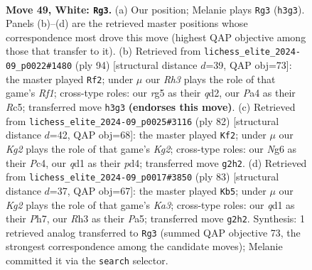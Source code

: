 \documentclass[11pt]{article}
\begin{document}
\clearpage

\begin{figure}[p]\centering
\begin{subfigure}{0.46\textwidth}\centering
\resizebox{\linewidth}{!}{%
\newchessgame
\chessboard[
  setfen={6k1/2r3p1/1p4N1/6r1/P2pp3/7R/5PK1/3q4 w - - 2 49},
  showmover=false,
  pgfstyle=straightmove, color=movearrow, markmove={h3-g3}
]}
\caption{}
\end{subfigure}\hfill
\begin{subfigure}{0.46\textwidth}\centering
\resizebox{\linewidth}{!}{%
\newchessgame
\chessboard[
  setfen={n7/3P2pk/p6p/2R1p3/4P3/7P/3q2K1/5R2 w - - 1 48},
  showmover=false,
  pgfstyle=straightmove, color=movearrow, markmove={f1-f2}
]}
\caption{}
\end{subfigure}
\\[4pt]
\begin{subfigure}{0.46\textwidth}\centering
\resizebox{\linewidth}{!}{%
\newchessgame
\chessboard[
  setfen={2r2k2/5p2/p3p3/4P1q1/P1Pp4/8/6K1/7R w - - 0 42},
  showmover=false,
  pgfstyle=straightmove, color=movearrow, markmove={g2-f2}
]}
\caption{}
\end{subfigure}\hfill
\begin{subfigure}{0.46\textwidth}\centering
\resizebox{\linewidth}{!}{%
\newchessgame
\chessboard[
  setfen={8/5p1p/k2R1p2/p4P2/2r5/6P1/1P5P/1K6 b - - 2 42},
  showmover=false,
  pgfstyle=straightmove, color=movearrow, markmove={a6-b5}
]}
\caption{}
\end{subfigure}
\caption{\textbf{Move 49, White: \texttt{Rg3}.} (a) Our position; Melanie plays \texttt{Rg3} (\texttt{h3g3}). Panels (b)--(d) are the retrieved master positions whose correspondence most drove this move (highest QAP objective among those that transfer to it). (b) Retrieved from \texttt{lichess\_elite\_2024-09\_p0022\#1480} (ply 94) [structural distance $d$=39, QAP obj=73]: the master played \texttt{Rf2}; under $\mu$ our \emph{Rh3} plays the role of that game's \emph{Rf1}; cross-type roles: our \emph{r}g5 as their \emph{q}d2, our \emph{P}a4 as their \emph{R}c5; transferred move \texttt{h3g3} \textbf{(endorses this move)}. (c) Retrieved from \texttt{lichess\_elite\_2024-09\_p0025\#3116} (ply 82) [structural distance $d$=42, QAP obj=68]: the master played \texttt{Kf2}; under $\mu$ our \emph{Kg2} plays the role of that game's \emph{Kg2}; cross-type roles: our \emph{N}g6 as their \emph{P}c4, our \emph{q}d1 as their \emph{p}d4; transferred move \texttt{g2h2}. (d) Retrieved from \texttt{lichess\_elite\_2024-09\_p0017\#3850} (ply 83) [structural distance $d$=37, QAP obj=67]: the master played \texttt{Kb5}; under $\mu$ our \emph{Kg2} plays the role of that game's \emph{Ka3}; cross-type roles: our \emph{q}d1 as their \emph{P}h7, our \emph{R}h3 as their \emph{P}a5; transferred move \texttt{g2h2}. Synthesis: 1 retrieved analog transferred to \texttt{Rg3} (summed QAP objective 73, the strongest correspondence among the candidate moves); Melanie committed it via the \texttt{search} selector.}
\label{fig:thought-m96}
\end{figure}
\end{document}
